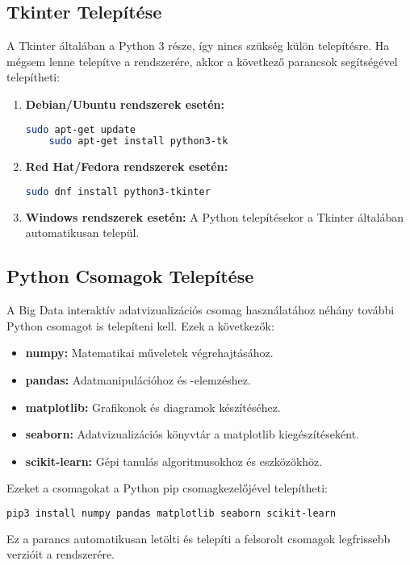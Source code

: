 \documentclass{article}
\begin{document}
\subsection{Tkinter Telepítése}
A Tkinter általában a Python 3 része, így nincs szükség külön telepítésre. Ha mégsem lenne telepítve a rendszerére, akkor a következő parancsok segítségével telepítheti:
\begin{enumerate}
    \item \textbf{Debian/Ubuntu rendszerek esetén:}
    \begin{lstlisting}[language=bash]
    sudo apt-get update
    sudo apt-get install python3-tk
    \end{lstlisting}
    \item \textbf{Red Hat/Fedora rendszerek esetén:}
    \begin{lstlisting}[language=bash]
    sudo dnf install python3-tkinter
    \end{lstlisting}
    \item \textbf{Windows rendszerek esetén:}
    A Python telepítésekor a Tkinter általában automatikusan települ.
\end{enumerate}

\subsection{Python Csomagok Telepítése}
A Big Data interaktív adatvizualizációs csomag használatához néhány további Python csomagot is telepíteni kell. Ezek a következők:
\begin{itemize}
    \item \textbf{numpy:} Matematikai műveletek végrehajtásához.
    \item \textbf{pandas:} Adatmanipulációhoz és -elemzéshez.
    \item \textbf{matplotlib:} Grafikonok és diagramok készítéséhez.
    \item \textbf{seaborn:} Adatvizualizációs könyvtár a matplotlib kiegészítéseként.
    \item \textbf{scikit-learn:} Gépi tanulás algoritmusokhoz és eszközökhöz.
\end{itemize}
Ezeket a csomagokat a Python pip csomagkezelőjével telepítheti:
\begin{lstlisting}[language=bash]
pip3 install numpy pandas matplotlib seaborn scikit-learn
\end{lstlisting}
Ez a parancs automatikusan letölti és telepíti a felsorolt csomagok legfrissebb verzióit a rendszerére.
\end{document}
